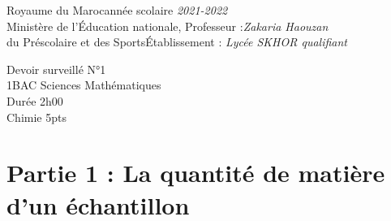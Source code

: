 \documentclass[12pt]{article}
\newcommand\headerMe[2]{\noindent{}#1\hfill#2}
\begin{document}
\headerMe{Royaume du Maroc}{année scolaire \emph{2021-2022}}\\
\headerMe{Ministère de l'Éducation nationale, }{  Professeur :\emph{Zakaria Haouzan}}\\
\headerMe{du Préscolaire et des Sports}{Établissement : \emph{Lycée SKHOR qualifiant}}\\

\begin{center}
Devoir surveillé N°1 \\
    1BAC Sciences Mathématiques\\
Durée 2h00
\\
    \vspace{.2cm}
\hrulefill
\Large{Chimie 5pts}
\hrulefill\\
\end{center}



 \section*{Partie 1 : La quantité de matière d'un échantillon }
\end{document}
